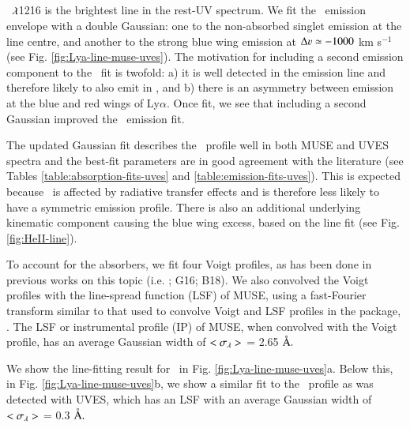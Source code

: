 \subsection{ \lya}\label{section:Lya-fit}

 \lya~$\lambda$1216 is the brightest line in the rest-UV spectrum. We fit the \lya~emission envelope with a double Gaussian: one to the non-absorbed singlet emission at the line centre, and another to the strong blue wing emission at $\Delta \varv \simeq -1000$ km s$^{-1}$ (see Fig. \ref{fig:Lya-line-muse-uves}). The motivation for including a second emission component to the \lya~fit is twofold: a) it is well detected in the emission line  and therefore likely to also emit in \lya, and b) there is an asymmetry between emission at the blue and red wings of Ly$\alpha.$ Once fit, we see that including a second Gaussian improved the \lya~emission fit. 

The updated Gaussian fit describes the \lya~profile well in both MUSE and UVES spectra and the best-fit parameters are in good agreement with the literature (see Tables \ref{table:absorption-fits-uves} and \ref{table:emission-fits-uves}). This is expected because \lya~is affected by radiative transfer effects and is therefore less likely to have a symmetric emission profile. There is also an additional underlying kinematic component causing the blue wing excess, based on the  line fit (see Fig. \ref{fig:HeII-line}). 

To account for the absorbers, we fit four Voigt profiles, as has been done in previous works on this topic (i.e. \citealp{vanojik1997,jarvis2003,wilman2004}; G16; B18). We also convolved the Voigt profiles with the line-spread function (LSF) of MUSE, using a fast-Fourier transform similar to that used to convolve Voigt and LSF profiles in the package,  \citep{krogager2018}. The LSF or instrumental profile (IP) of MUSE, when convolved with the Voigt profile, has an average Gaussian width of $<\sigma_\lambda>$ = 2.65 $\mbox{\normalfont\AA }.$ 

We show the line-fitting result for \lya~in Fig. \ref{fig:Lya-line-muse-uves}a. Below this, in Fig. \ref{fig:Lya-line-muse-uves}b, we show a similar fit to the \lya~profile as was detected with UVES, which has an LSF with an average Gaussian width of $<\sigma_\lambda>$ = 0.3 $\mbox{\normalfont\AA }.$ 

